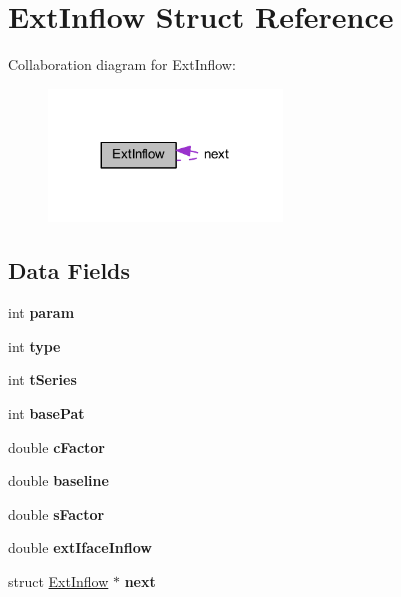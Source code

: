 \hypertarget{struct_ext_inflow}{}\section{Ext\+Inflow Struct Reference}
\label{struct_ext_inflow}


Collaboration diagram for Ext\+Inflow\+:
\nopagebreak
\begin{figure}[H]
\begin{center}
\leavevmode
\includegraphics[width=176pt]{db/d17/struct_ext_inflow__coll__graph}
\end{center}
\end{figure}
\subsection*{Data Fields}
\begin{DoxyCompactItemize}
\item 
\mbox{\label{struct_ext_inflow_a1a3bcdb98792a1ce2e9c403f4b10292a}} 
int {\bfseries param}
\item 
\mbox{\label{struct_ext_inflow_ac765329451135abec74c45e1897abf26}} 
int {\bfseries type}
\item 
\mbox{\label{struct_ext_inflow_a3de729b1c96053f3bd7fa21323bbb78c}} 
int {\bfseries t\+Series}
\item 
\mbox{\label{struct_ext_inflow_af8cc34f97b531cf3926b2f6d0ca48bcb}} 
int {\bfseries base\+Pat}
\item 
\mbox{\label{struct_ext_inflow_a1ce4b248ae864669d7209ee42251fe9d}} 
double {\bfseries c\+Factor}
\item 
\mbox{\label{struct_ext_inflow_ad3ed0bb4daedd873ee77834d3929fadd}} 
double {\bfseries baseline}
\item 
\mbox{\label{struct_ext_inflow_ade346b84b22c554fe4e86ff61de9479d}} 
double {\bfseries s\+Factor}
\item 
\mbox{\label{struct_ext_inflow_acf76866a7592eb6c27fc867641126abc}} 
double {\bfseries ext\+Iface\+Inflow}
\item 
\mbox{\label{struct_ext_inflow_a30c1ec9187649ba368c0bb7a1c2a185b}} 
struct \hyperlink{struct_ext_inflow}{Ext\+Inflow} $\ast$ {\bfseries next}
\end{DoxyCompactItemize}


